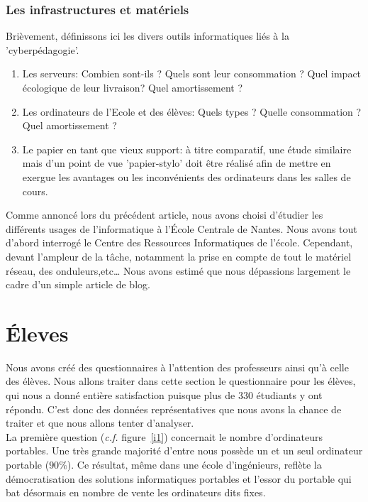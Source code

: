 \documentclass[a4paper,11pt,french]{article}
\begin{document}
\subsubsection{Les infrastructures et matériels}
Brièvement, définissons ici les divers outils informatiques liés à la 'cyberpédagogie'. 
\begin{enumerate}
\item Les serveurs: Combien sont-ils ? Quels sont leur consommation ? Quel impact écologique de leur livraison? Quel amortissement ?
\item Les ordinateurs de l'Ecole et des élèves: Quels types ? Quelle consommation ? Quel amortissement ?
\item Le papier en tant que vieux support: à titre comparatif, une étude similaire mais d'un point de vue 'papier-stylo' doit être réalisé afin de mettre en exergue les avantages ou les inconvénients des ordinateurs dans les salles de cours.
\end{enumerate}


Comme annoncé lors du précédent article, nous avons choisi d’étudier les différents usages de l’informatique à l’École Centrale de Nantes. Nous avons tout d’abord interrogé le Centre des Ressources Informatiques de l’école. Cependant, devant l’ampleur de la tâche, notamment la prise en compte de tout le matériel réseau, des onduleurs,etc… Nous avons estimé que nous dépassions largement le cadre d’un simple article de blog.

\section{\'Eleves}
Nous avons créé des questionnaires à l’attention des professeurs ainsi qu’à celle des élèves. Nous allons traiter dans cette section le questionnaire pour les élèves, qui nous a donné entière satisfaction puisque plus de 330 étudiants y ont répondu. C’est donc des données représentatives que nous avons la chance de traiter et que nous allons tenter d’analyser.\\

La première question (\textit{c.f.} figure~\vref{i1}) concernait le nombre d’ordinateurs portables. Une très grande majorité d’entre nous possède un et un seul ordinateur portable ($90\%$). Ce résultat, même dans une école d’ingénieurs, reflète la démocratisation des solutions informatiques portables et l’essor du portable qui bat désormais en nombre de vente les ordinateurs dits fixes.\\
\end{document}

